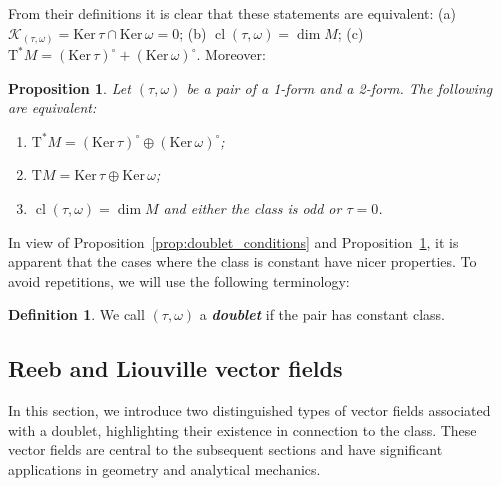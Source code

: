 \documentclass[11pt,twoside]{article}
\theoremstyle{plain}
\newtheorem{proposition}[theorem]{Proposition}
\theoremstyle{definition}
\newtheorem{definition}[theorem]{Definition}
\newcommand{\T}{{\mathrm T}}
\DeclareMathOperator{\cl}{cl}
\newcommand\dfn[1]{{\textbf{\emph{#1}}}}
\def\Ker{\mathrm{Ker \,}}
\def\K{\mathcal{K}}
\begin{document}
From their definitions it is clear that these statements are equivalent:
(a) $\K_{(\tau,\omega)} = \Ker \tau \cap \Ker \omega = 0$;
(b) $\cl(\tau,\omega) = \dim M$;
(c) $\T^*M = (\Ker \tau)^{\circ} + (\Ker \omega)^{\circ}$.
Moreover:

\begin{proposition}
\label{prop:directsum}
Let $(\tau,\omega)$ be a pair of a 1-form and a 2-form. 
The following are equivalent:
\begin{enumerate}[$(i)$]
\item 
$\T^* M =(\Ker \tau)^{\circ} \oplus (\Ker \omega)^{\circ}$;
\item
$\T M = \Ker \tau \oplus \Ker \omega $;
\item 
$\cl (\tau,\omega) = \dim M$ and either the class is odd or $\tau=0$.
\end{enumerate}
\end{proposition}

In view of Proposition~\ref{prop:doublet_conditions} and Proposition~\ref{prop:directsum},
it is apparent that the cases where the class is constant
have nicer properties.
To avoid repetitions,
we will use the following terminology:

\begin{definition}
We call $(\tau,\omega)$ a \dfn{doublet} if the
pair has constant class.
\end{definition}


\subsection{Reeb and Liouville vector fields}
\label{sec_ReebLiouville}


In this section, we introduce two distinguished types of vector fields associated with a doublet, highlighting their existence in connection to the class. 
These vector fields are central to the subsequent sections and have significant applications in geometry and analytical mechanics.
\end{document}
